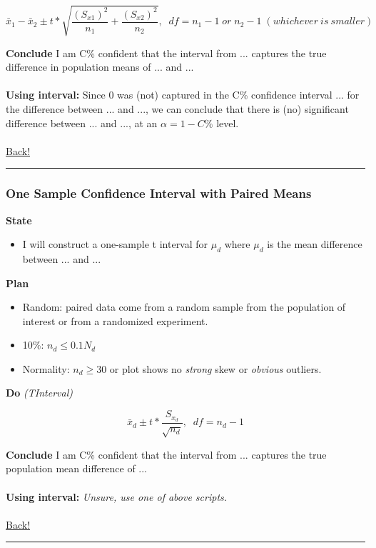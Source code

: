 \documentclass[main]{subfiles}
\begin{document}
\[\bar{x}_1 - \bar{x}_2 \pm t* \sqrt{\frac{(S_{x1})^2}{n_1} + \frac{(S_{x2})^2}{n_2}},\;\;df = n_1 - 1 \;or\; n_2 - 1 \;(whichever\:is\:smaller)\]

\noindent\textbf{Conclude}
I am C\% confident that the interval from ... captures the true difference in population means of ... and ...
\\~\\
\noindent\textbf{Using interval:} Since 0 was (not) captured in the C\% confidence interval ... for the difference between ... and ..., we can conclude that there is (no) significant difference between ... and ..., at an $\alpha = 1 - C\%$ level.
\\~\\
\noindent\hyperlink{toc}{Back!}
\newline\hrule

\subsubsection{One Sample Confidence Interval with Paired Means}
\textbf{State}
\begin{itemize}
    \item I will construct a one-sample t interval for $\mu_d$ where $\mu_d$ is the mean difference between ... and ...
\end{itemize}
\textbf{Plan}
\begin{itemize}
    \item Random: paired data come from a random sample from the population of interest or from a randomized experiment.
    \item 10\%: $n_d \leq 0.1N_d$
    \item Normality: $n_d \geq 30$ or plot shows no \textit{strong} skew or \textit{obvious} outliers.
\end{itemize}
\textbf{Do} \textit{(TInterval)}

\[\bar{x}_d \pm t* \frac{S_{x_d}}{\sqrt{n_d}},\;\;df = n_d - 1\]

\noindent\textbf{Conclude}
I am C\% confident that the interval from ... captures the true population mean difference of ...
\\~\\
\noindent\textbf{Using interval:} \textit{Unsure, use one of above scripts.}
\\~\\
\noindent\hyperlink{toc}{Back!}
\newline\hrule

\end{document}
